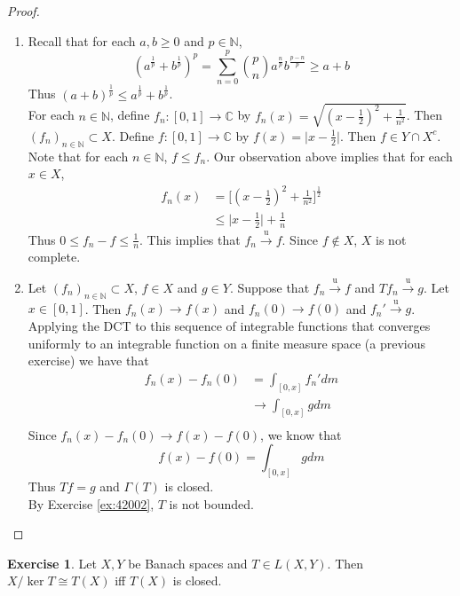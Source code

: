 \documentclass[12pt]{amsart}
\theoremstyle{definition}
\newtheorem{ex}[definition]{Exercise}
\newcommand{\Gam}{\Gamma}
\newcommand{\C}{\mathbb{C}}
\newcommand{\N}{\mathbb{N}}
\newcommand{\convt}[1]{\xrightarrow{\text{#1}}}
\newcommand{\conv}[1]{\xrightarrow{#1}}
\newcommand{\lex}[1]{\label{ex:#1}}
\newcommand{\rex}[1]{Exercise \ref{ex:#1}}
\begin{document}
	\begin{proof}
		\begin{enumerate}
			\item Recall that for each $a,b \geq 0$ and $p \in \N$, $$(a^{\frac{1}{p}}+b^{\frac{1}{p}})^p = \sum_{n=0}^p  {p \choose n} a^{\frac{n}{p}}b^{\frac{p-n}{p}} \geq a + b$$ Thus $(a+b)^{\frac{1}{p}} \leq a^{\frac{1}{p}}+b^{\frac{1}{p}}$.\\
			For each $n \in \N$, define $f_n: [0,1] \rightarrow \C$ by $f_n(x) = \sqrt{(x-\frac{1}{2})^2+ \frac{1}{n^2}}$. Then $(f_n)_{n \in \N} \subset X$. Define $f:[0,1] \rightarrow \C$ by $f(x) = \vert x-\frac{1}{2}\vert$. Then $f \in Y \cap X^c$. Note that for each $n \in \N$, $f \leq f_n$. Our observation above implies that for each $x \in X$,
			\begin{align*}
				f_n(x) 
				&= \bigg[ (x-\frac{1}{2})^2 + \frac{1}{n^2} \bigg]^{\frac{1}{2}}\\
				& \leq \vert x-\frac{1}{2} \vert + \frac{1}{n}
			\end{align*}
			Thus $0 \leq f_n - f \leq \frac{1}{n} $. This implies that $f_n \convt{u} f$. Since $f \not \in X$, $X$ is not complete. \vspace{.5cm}\\
			\item Let $(f_n)_{n \in \N} \subset X$, $f \in X$ and $g \in Y$. Suppose that $f_n \convt{u} f$ and $Tf_n \convt{u} g$. Let $x \in [0,1]$. Then $f_n(x) \conv{} f(x)$ and $f_n(0) \conv{} f(0)$ and $f_n' \convt{u} g$. Applying the DCT to this sequence of integrable functions that converges uniformly to an integrable function on a finite measure space (a previous exercise) we have that
			\begin{align*}
				f_n(x) - f_n(0) 
				&= \int_{[0,x]} f_n' dm \\
				& \rightarrow \int_{[0,x]} g dm \\ 
			\end{align*} 
			Since $f_n(x) - f_n(0) \conv{} f(x) - f(0)$, we know that $$f(x) - f(0) = \int_{[0,x]} g dm$$ Thus $Tf = g$ and $\Gam(T)$ is closed. \\
			By \rex{42002}, $T$ is not bounded.
		\end{enumerate}
	\end{proof}
	
	\begin{ex} \lex{}
		Let $X, Y$ be Banach spaces and $T \in L(X,Y)$. Then $X/\ker T \cong T(X)$ iff $T(X)$ is closed.
	\end{ex}
	
\end{document}
